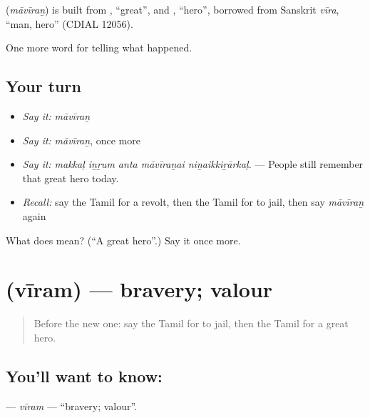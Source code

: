 \begin{cousinweb}
\textbf{} (\emph{māvīraṉ}) is built from , \textquotedblleft{}great\textquotedblright{}, and , \textquotedblleft{}hero\textquotedblright{}, borrowed from Sanskrit \emph{vīra}, \textquotedblleft{}man, hero\textquotedblright{} (CDIAL 12056).
\end{cousinweb}

\begin{grammarlens}[title={What you've built}]
One more word for telling what happened.
\end{grammarlens}

\subsection*{Your turn}
\begin{itemize}
\raggedright
  \item \emph{Say it:} \emph{māvīraṉ}
  \item \emph{Say it:} \emph{māvīraṉ}, once more
  \item \emph{Say it:} \emph{makkaḷ iṉṟum anta māvīraṉai niṉaikkiṟārkaḷ.} — People still remember that great hero today.
  \item \emph{Recall:} say the Tamil for a revolt, then the Tamil for to jail, then say \emph{māvīraṉ} again
\end{itemize}

\begin{tcolorbox}[breakable,colback=teal!4,colframe=teal!35!black,title={Before you move on}]
What does  mean? (\textquotedblleft{}A great hero\textquotedblright{}.) Say it once more.
\end{tcolorbox}
\section[\texorpdfstring{\ta{வீரம்} (vīram)}{வீரம் (vīram)}]{ (vīram) — bravery; valour}

\label{lesson:TA-C339-viram}



\begin{quote}
Before the new one: say the Tamil for to jail, then the Tamil for a great hero.
\end{quote}

\subsection*{You'll want to know: }
\textbf{} — \emph{vīram} — \textquotedblleft{}bravery; valour\textquotedblright{}.

